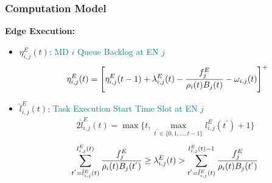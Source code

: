 \begin{frame}
	\frametitle{Computation Model}
	\textbf{Edge Execution:}
	
	\vfill
	
	\begin{itemize}[]
		

		
		
		\item $\eta_{i,j}^{E}(t)$: \textcolor{teal}{MD $i$ Queue Backlog at EN $j$}
		\vspace{-2mm}
		\begin{alignat}{2}
				\eta_{i,j}^{E}(t)=\left[\eta_{i,j}^{E}(t-1)+\lambda_{i,j}^{E}(t)-{f_j^{E}\over \rho_i(t)B_j(t)} -\omega_{i,j}(t)\right]^+\hspace{-1.7mm}
			\label{10}  
		\end{alignat}
	
		\item $\hat{l}_{i,j}^{E}(t)$: \textcolor{teal}{Task Execution Start Time Slot at EN $j$}
		\vspace{-2mm}
		\begin{alignat}{2}
			\hat{l}_{i,j}^{E}(t) = \max \{t, \max \limits_{t^{'} \in \{0,1,\ldots,t-1\}} l_{i,j}^{E}(t^{'})+1\}
			\label{11}  
		\end{alignat}
			\vspace{-4mm}
		\begin{alignat}{2}
				\sum_{t^{'}=\hat{l}_{i,j}^{E}(t)}^{l_{i,j}^{E}(t)}{f_j^{E} \over \rho_i(t)B_j(t^{'})}  \geq   \lambda_{i,j}^{E}(t) > \sum_{t^{'}=\hat{l}_{i,j}^{E}(t)}^{l_{i,j}^{E}(t)-1}{f_j^{E} \over \rho_i(t)B_j(t^{'})} 
				\label{12} 
		\end{alignat}
		
		

		
	\end{itemize}
\end{frame}


